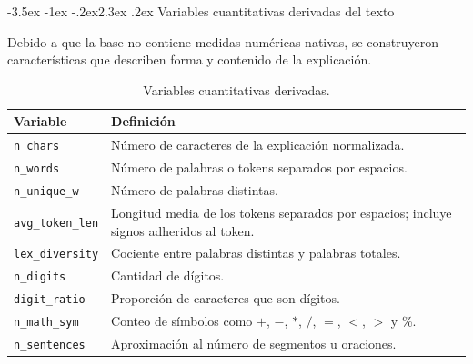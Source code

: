 \documentclass[11pt,oneside,openany]{book}
\makeatletter
\renewcommand\section{\@startsection{section}{1}{\z@}%
  {-3.5ex \@plus -1ex \@minus -.2ex}{2.3ex \@plus .2ex}%
  {\normalfont\Large\sffamily\bfseries\color{AzulMedio}}}
\newcommand{\codigo}[1]{\texttt{#1}}
\makeatother
\begin{document}
\section{Variables cuantitativas derivadas del texto}

Debido a que la base no contiene medidas numéricas nativas, se construyeron
características que describen forma y contenido de la explicación.

\begin{table}[htbp]
\centering
\caption{Variables cuantitativas derivadas.}
\label{tab:derivadas}
\begin{tabularx}{\textwidth}{@{}p{3.2cm}Y@{}}
\toprule
\textbf{Variable} & \textbf{Definición}\\
\midrule
\codigo{n\_chars} & Número de caracteres de la explicación normalizada.\\
\codigo{n\_words} & Número de palabras o tokens separados por espacios.\\
\codigo{n\_unique\_w} & Número de palabras distintas.\\
\codigo{avg\_token\_len} & Longitud media de los tokens separados por espacios;
incluye signos adheridos al token.\\
\codigo{lex\_diversity} & Cociente entre palabras distintas y palabras totales.\\
\codigo{n\_digits} & Cantidad de dígitos.\\
\codigo{digit\_ratio} & Proporción de caracteres que son dígitos.\\
\codigo{n\_math\_sym} & Conteo de símbolos como $+$, $-$, $*$, $/$, $=$,
$<$, $>$ y \%.\\
\codigo{n\_sentences} & Aproximación al número de segmentos u oraciones.\\
\bottomrule
\end{tabularx}
\end{table}
\end{document}
